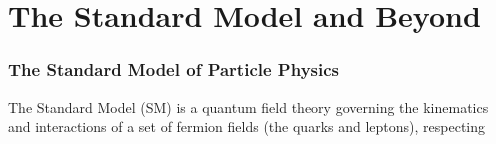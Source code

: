 \chapter{The Standard Model and Beyond}
\label{sec:theory}

\subsection{The Standard Model of Particle Physics}

The Standard Model (SM) is a quantum field theory governing the kinematics and interactions of a set of fermion fields (the quarks and leptons), respecting 
